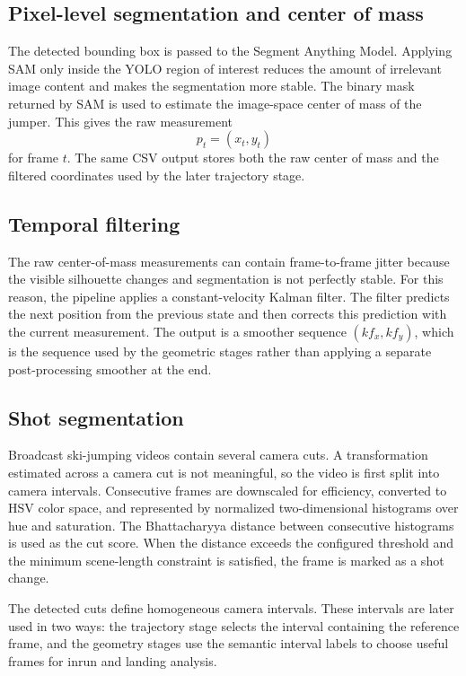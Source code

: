 \subsection{Pixel-level segmentation and center of mass}
The detected bounding box is passed to the Segment Anything Model. Applying SAM only inside the YOLO region of interest reduces the amount of irrelevant image content and makes the segmentation more stable. The binary mask returned by SAM is used to estimate the image-space center of mass of the jumper. This gives the raw measurement
\[
p_t = (x_t,y_t)
\]
for frame \(t\). The same CSV output stores both the raw center of mass and the filtered coordinates used by the later trajectory stage.

\subsection{Temporal filtering}
The raw center-of-mass measurements can contain frame-to-frame jitter because the visible silhouette changes and segmentation is not perfectly stable. For this reason, the pipeline applies a constant-velocity Kalman filter. The filter predicts the next position from the previous state and then corrects this prediction with the current measurement. The output is a smoother sequence \((kf_x,kf_y)\), which is the sequence used by the geometric stages rather than applying a separate post-processing smoother at the end.

\subsection{Shot segmentation}
Broadcast ski-jumping videos contain several camera cuts. A transformation estimated across a camera cut is not meaningful, so the video is first split into camera intervals. Consecutive frames are downscaled for efficiency, converted to HSV color space, and represented by normalized two-dimensional histograms over hue and saturation. The Bhattacharyya distance between consecutive histograms is used as the cut score. When the distance exceeds the configured threshold and the minimum scene-length constraint is satisfied, the frame is marked as a shot change.

The detected cuts define homogeneous camera intervals. These intervals are later used in two ways: the trajectory stage selects the interval containing the reference frame, and the geometry stages use the semantic interval labels to choose useful frames for inrun and landing analysis.

